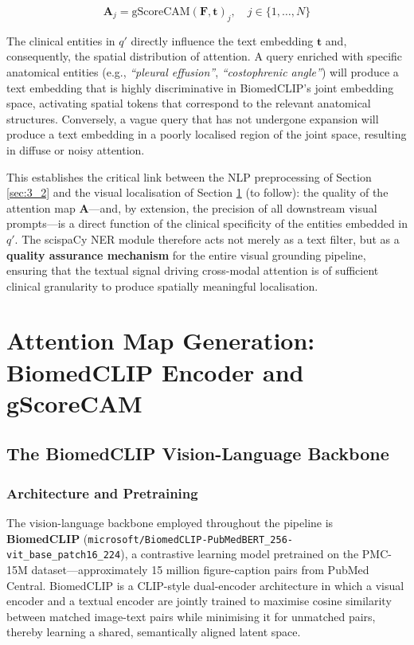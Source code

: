 \[
\mathbf{A}_{j} = \text{gScoreCAM}(\mathbf{F}, \mathbf{t})_j, \quad j \in \{1, \ldots, N\}
\]

The clinical entities in $q'$ directly influence the text embedding $\mathbf{t}$ and, consequently, the spatial distribution of attention. A query enriched with specific anatomical entities (e.g., \textit{``pleural effusion''}, \textit{``costophrenic angle''}) will produce a text embedding that is highly discriminative in BiomedCLIP's joint embedding space, activating spatial tokens that correspond to the relevant anatomical structures. Conversely, a vague query that has not undergone expansion will produce a text embedding in a poorly localised region of the joint space, resulting in diffuse or noisy attention.

This establishes the critical link between the NLP preprocessing of Section \ref{sec:3_2} and the visual localisation of Section \ref{sec:3_3} (to follow): the quality of the attention map $\mathbf{A}$---and, by extension, the precision of all downstream visual prompts---is a direct function of the clinical specificity of the entities embedded in $q'$. The scispaCy NER module therefore acts not merely as a text filter, but as a \textbf{quality assurance mechanism} for the entire visual grounding pipeline, ensuring that the textual signal driving cross-modal attention is of sufficient clinical granularity to produce spatially meaningful localisation.

\section{Attention Map Generation: BiomedCLIP Encoder and gScoreCAM}
\label{sec:3_3}
\subsection{The BiomedCLIP Vision-Language Backbone}
\label{sec:3_3_1}

\subsubsection{Architecture and Pretraining}
\label{sec:3_3_1_1}

The vision-language backbone employed throughout the pipeline is \textbf{BiomedCLIP} (\texttt{microsoft/BiomedCLIP-PubMedBERT\_256-vit\_base\_patch16\_224}), a contrastive learning model pretrained on the PMC-15M dataset---approximately 15 million figure-caption pairs from PubMed Central.  BiomedCLIP is a CLIP-style dual-encoder architecture in which a visual encoder and a textual encoder are jointly trained to maximise cosine similarity between matched image-text pairs while minimising it for unmatched pairs, thereby learning a shared, semantically aligned latent space.

